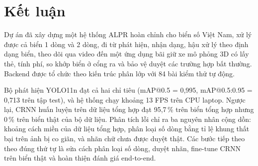 \section{Kết luận}
Dự án đã xây dựng một hệ thống ALPR hoàn chỉnh cho biển số Việt Nam, xử lý được cả biển 1 dòng và 2 dòng, đi từ phát hiện, nhận dạng, hậu xử lý theo định dạng biển, theo dõi qua video đến một ứng dụng bãi giữ xe mô phỏng 3D có lấy thẻ, tính phí, so khớp biển ở cổng ra và bảo vệ duyệt các trường hợp bất thường. Backend được tổ chức theo kiến trúc phân lớp với 84 bài kiểm thử tự động.

Bộ phát hiện YOLO11n đạt cả hai chỉ tiêu (mAP@0.5 = 0,995, mAP@0.5:0.95 = 0,713 trên tập test), và hệ thống chạy khoảng 13 FPS trên CPU laptop. Ngược lại, CRNN huấn luyện trên dữ liệu tổng hợp đạt 95,7\,\% trên biển tổng hợp nhưng 0\,\% trên biển thật của bộ dữ liệu. Phân tích lỗi chỉ ra ba nguyên nhân cộng dồn: khoảng cách miền của dữ liệu tổng hợp, phân loại số dòng bằng tỉ lệ khung thất bại trên ảnh bị co giãn, và nhãn chữ chưa được duyệt thật. Các bước tiếp theo theo đúng thứ tự là sửa cách phân loại số dòng, duyệt nhãn, fine-tune CRNN trên biển thật và hoàn thiện đánh giá end-to-end.
